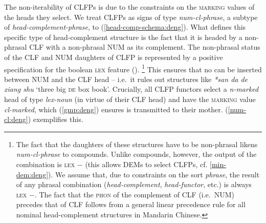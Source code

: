 \documentclass[output=paper,colorlinks,citecolor=brown]{langscibook}
\begin{document}
The non-iterability of CLFPs is due to the constraints on the \textsc{marking} values of the heads they select. We treat CLFPs as signs of type \textit{num-cl-phrase}, a subtype of \textit{head-complement-phrase},  to (\ref{head-comp-schema:deng}). What defines this specific type of head-complement structure is the fact that it is headed by a non-phrasal CLF with a non-phrasal NUM as its complement. The non-phrasal status of the CLF and NUM daughters of CLFP is represented by a positive specification for the boolean \textsc{lex} feature (\citealt[72--73]{Pollard&Sag87a}).%
%
\footnote{The fact that the daughters of these structures have to be non-phrasal likens \textit{num-cl-phrase} to compounds. Unlike compounds, however, the output of the combination is \textsc{lex} $-$ (this allows DEMs to select CLFPs, cf. \ref{min-dem:deng}). We assume that, due to constraints on the sort \textit{phrase}, the result of any phrasal combination (\textit{head-complement}, \textit{head-functor}, etc.)  is always \textsc{lex} $-$. The fact that the \textsc{phon} of the complement of CLF (i.e.\ NUM) precedes that of CLF follows from a general linear precedence rule for all nominal head-complement structures in Mandarin Chinese.} 
%
This ensures that no  can be inserted between NUM and the CLF head -- i.e.\ it rules out structures like \textit{*san da de xiang shu} `three big \textsc{de} box book'. Crucially, all CLFP functors select a \textit{n-marked} head of type \textit{lex-noun} (in virtue of their CLF head) and have the \textsc{marking} value \textit{cl-marked}, which (\ref{gmp:deng}) ensures is transmitted to their mother. (\ref{num-cl:deng}) exemplifies this. 
%
%
\end{document}
